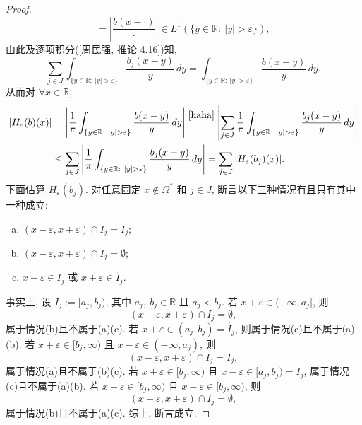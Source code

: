 \documentclass[a4paper,11pt]{article}
\theoremstyle{definition}
\begin{document}
\begin{CJK*}{UTF8}{gbsn}
\begin{proof}
$$            = \left| \frac{b(x - \cdot)}{\cdot} \right| 
            \in L^1(\{y \in \mathbb{R} :\ |y| > \varepsilon\}),
    $$
    由此及逐项积分([周民强, 推论 4.16])知,
    \begin{equation} \label{haha}
        \sum_{j \in J} \int_{\{y \in \mathbb{R} :\ |y| > \varepsilon\}} \frac{b_j(x - y)}{y} \, dy
            = \int_{\{y \in \mathbb{R} :\ |y| > \varepsilon\}} \frac{b(x - y)}{y} \, dy.
    \end{equation}
    从而对 $ \forall x \in \mathbb{R} $,
    \begin{align} \label{add1}
        |H_\varepsilon (b)(x)| 
            &= \left| \frac{1}{\pi} \int_{\{y \in \mathbb{R} :\ |y| > \varepsilon\}} \frac{b(x - y)}{y} \, dy \right| 
            \overset{\eqref{haha}}{=} \left| \sum_{j \in J} \frac{1}{\pi} \int_{\{y \in \mathbb{R} :\ |y| > \varepsilon\}}  
                \frac{b_j(x - y)}{y} \, dy \right|  \\
            &\leq \sum_{j \in J} \left| \frac{1}{\pi} \int_{\{y \in \mathbb{R} :\ |y| > \varepsilon\}}  
                \frac{b_j(x - y)}{y} \, dy \right| \notag 
            = \sum_{j \in J} |H_\varepsilon (b_j)(x)|. \notag
    \end{align}
    下面估算 $ H_\varepsilon (b_j) $. 对任意固定 $ x \notin \Omega^* $ 和 $ j \in J $,
    断言以下三种情况有且只有其中一种成立:
    \begin{enumerate}[(a)]
      \item $ (x - \varepsilon, x + \varepsilon) \cap I_j = I_j $;
      \item $ (x - \varepsilon, x + \varepsilon) \cap I_j = \emptyset $;
      \item $ x - \varepsilon \in I_j $ 或 $ x + \varepsilon \in \mathring{I_j} $.
    \end{enumerate}
    事实上, 设 $ I_j := [a_j, b_j) $, 其中 $ a_j,\ b_j \in \mathbb{R} $ 且 $ a_j < b_j $.
    若 $ x + \varepsilon \in (-\infty, a_j] $, 则 
    $$
        (x - \varepsilon, x + \varepsilon) \cap I_j = \emptyset,
    $$
    属于情况(b)且不属于(a)(c). 
    若 $ x + \varepsilon \in (a_j, b_j) = \mathring{I_j} $, 则属于情况(c)且不属于(a)(b).
    若 $ x + \varepsilon \in [b_j, \infty) $ 且 $ x - \varepsilon \in (-\infty, a_j) $, 则
    $$
        (x - \varepsilon, x + \varepsilon) \cap I_j = I_j,
    $$
    属于情况(a)且不属于(b)(c). 
    若 $ x + \varepsilon \in [b_j, \infty) $ 且 $ x - \varepsilon \in [a_j, b_j) = I_j $, 
    属于情况(c)且不属于(a)(b).
    若 $ x + \varepsilon \in [b_j, \infty) $ 且 $ x - \varepsilon \in [b_j, \infty) $, 则
    $$
        (x - \varepsilon, x + \varepsilon) \cap I_j = \emptyset,
    $$
    属于情况(b)且不属于(a)(c). 综上, 断言成立.
    

\end{proof}
\end{CJK*}
\end{document}
